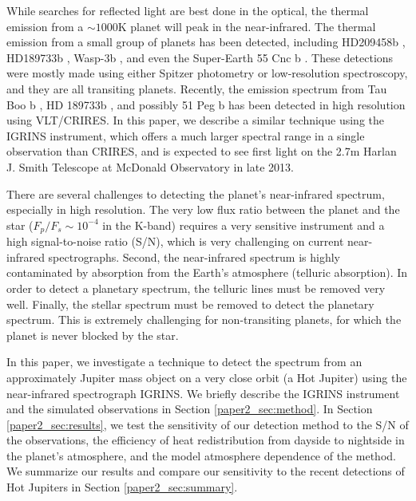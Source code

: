 While searches for reflected light are best done in the optical, the
thermal emission from a $\sim 1000$K planet will peak in the
near-infrared. The thermal emission from a small group of planets has been detected,
including HD209458b \citep[e.g.][]{Knutson2007, Swain2008,
  Cubillos2010}, HD189733b \citep[e.g.][]{Grillmair2007, Knutson2007_2,
  Char2008, Agol2010}, Wasp-3b \citep{Zhao2012}, and even the
Super-Earth 55 Cnc b \citep{Demory2012}. These detections were mostly made
using either Spitzer photometry or low-resolution spectroscopy, and
they are all transiting planets. Recently, the emission spectrum from Tau Boo b \citep{Brogi2012, Rodler2012}, HD 189733b \citep{deKok2013}, and possibly 51 Peg b \citep{Brogi2013} has been detected in high resolution using VLT/CRIRES. In this paper, we describe a similar technique using the IGRINS instrument, which offers a much larger spectral range in a single observation than CRIRES, and is expected to see first light on the 2.7m Harlan J. Smith Telescope at McDonald Observatory in late 2013.

There are several challenges to detecting the planet's near-infrared spectrum, especially in high resolution. The very low flux ratio between the planet and the star ($F_p/F_s \sim 10^{-4}$ in the K-band) requires a very sensitive instrument and a high signal-to-noise ratio (S/N), which is very challenging on current near-infrared spectrographs. Second, the near-infrared spectrum is highly contaminated by absorption from the Earth's atmosphere (telluric absorption). In order to detect a planetary spectrum, the telluric lines must be removed very well. Finally, the stellar spectrum must be removed to detect the planetary spectrum. This is extremely challenging for non-transiting planets, for which the planet is never blocked by the star. 

In this paper, we investigate a technique to detect the spectrum from an approximately Jupiter mass object on a very close orbit (a Hot Jupiter) using the near-infrared spectrograph IGRINS. We briefly describe the IGRINS instrument and the simulated observations in Section \ref{paper2_sec:method}. In Section \ref{paper2_sec:results}, we test the sensitivity of our detection method to the S/N of the observations, the efficiency of heat redistribution from dayside to nightside in the planet's atmosphere, and the model atmosphere dependence of the method. We summarize our results and compare our sensitivity to the recent detections of Hot Jupiters in Section \ref{paper2_sec:summary}.


